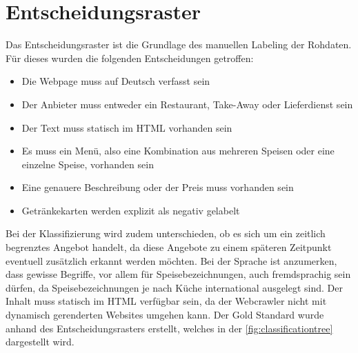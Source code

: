 \section{Entscheidungsraster}
Das Entscheidungsraster ist die Grundlage des manuellen Labeling der Rohdaten.
Für dieses wurden die folgenden Entscheidungen getroffen:
\begin{itemize}
	\item Die Webpage muss auf Deutsch verfasst sein
	\item Der Anbieter muss entweder ein Restaurant, Take-Away oder Lieferdienst sein
	\item Der Text muss statisch im HTML vorhanden sein
	\item Es muss ein Menü, also eine Kombination aus mehreren Speisen oder eine einzelne Speise, vorhanden sein
	\item Eine genauere Beschreibung oder der Preis muss vorhanden sein
	\item Getränkekarten werden explizit als negativ gelabelt
\end{itemize}
Bei der Klassifizierung wird zudem unterschieden, ob es sich um ein zeitlich begrenztes Angebot handelt, da diese Angebote zu einem späteren Zeitpunkt eventuell zusätzlich erkannt werden möchten.
Bei der Sprache ist anzumerken, dass gewisse Begriffe, vor allem für Speisebezeichnungen, auch fremdsprachig sein dürfen, da Speisebezeichnungen je nach Küche international ausgelegt sind.
Der Inhalt muss statisch im HTML verfügbar sein, da der Webcrawler nicht mit dynamisch gerenderten Websites umgehen kann.
Der Gold Standard wurde anhand des Entscheidungsrasters erstellt, welches in der \cref{fig:classificationtree} dargestellt wird.
\FloatBarrier
